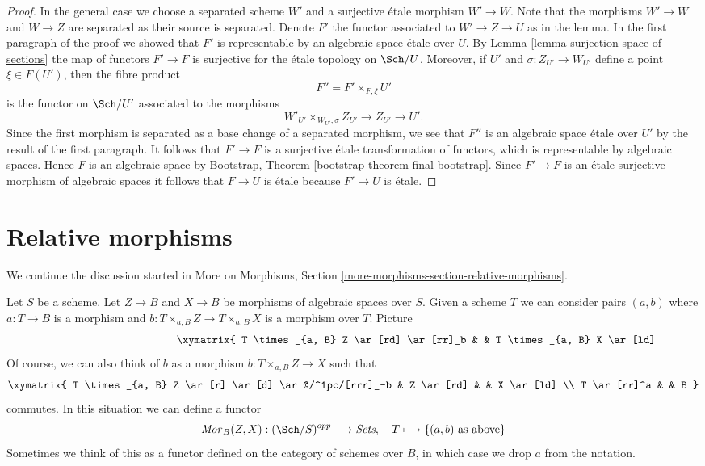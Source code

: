 \begin{proof}
\medskip\noindent
In the general case we choose a separated scheme $W'$ and a surjective
\'etale morphism $W' \to W$. Note that the morphisms $W' \to W$ and
$W \to Z$ are separated as their source is separated. Denote $F'$ the
functor associated to $W' \to Z \to U$ as in the lemma. In the first
paragraph of the proof we showed that $F'$ is representable by an
algebraic space \'etale over $U$. By
Lemma \ref{lemma-surjection-space-of-sections}
the map of functors $F' \to F$ is surjective for the \'etale topology
on $\Sch/U$. Moreover, if $U'$ and $\sigma : Z_{U'} \to W_{U'}$
define a point $\xi \in F(U')$, then the fibre product
$$
F'' = F' \times_{F, \xi} U'
$$
is the functor on $\Sch/U'$ associated to the morphisms
$$
W'_{U'} \times_{W_{U'}, \sigma} Z_{U'} \to Z_{U'} \to U'.
$$
Since the first morphism is separated as a base change of a separated
morphism, we see that $F''$ is an algebraic space \'etale over $U'$
by the result of the first paragraph. It follows that $F' \to F$ is a
surjective \'etale transformation of functors, which is representable
by algebraic spaces. Hence $F$ is an algebraic space by
Bootstrap, Theorem \ref{bootstrap-theorem-final-bootstrap}.
Since $F' \to F$ is an \'etale surjective morphism of algebraic spaces
it follows that $F \to U$ is \'etale because $F' \to U$ is \'etale.
\end{proof}









\section{Relative morphisms}
\label{section-relative-morphisms}

\noindent
We continue the discussion started in
More on Morphisms, Section \ref{more-morphisms-section-relative-morphisms}.

\medskip\noindent
Let $S$ be a scheme. Let $Z \to B$ and $X \to B$ be morphisms of
algebraic spaces over $S$. Given a scheme $T$ we can consider pairs
$(a, b)$ where $a : T \to B$
is a morphism and $b : T \times_{a, B} Z \to T \times_{a, B} X$
is a morphism over $T$. Picture
\begin{equation}
\label{equation-hom}
\vcenter{
\xymatrix{
T \times_{a, B} Z \ar[rd] \ar[rr]_b & &
T \times_{a, B} X \ar[ld] & Z \ar[rd] & & X \ar[ld] \\
& T \ar[rrr]^a & & & B
}
}
\end{equation}
Of course, we can also think of $b$ as a morphism
$b : T \times_{a, B} Z \to X$ such that
$$
\xymatrix{
T \times_{a, B} Z \ar[r] \ar[d] \ar@/^1pc/[rrr]_-b &
Z \ar[rd] & & X \ar[ld] \\
T \ar[rr]^a & & B
}
$$
commutes. In this situation we can define a functor
\begin{equation}
\label{equation-hom-functor}
\mathit{Mor}_B(Z, X) : (\Sch/S)^{opp} \longrightarrow \textit{Sets},
\quad
T \longmapsto \{(a, b)\text{ as above}\}
\end{equation}
Sometimes we think of this as a functor defined on the category
of schemes over $B$, in which case we drop $a$ from the notation.

